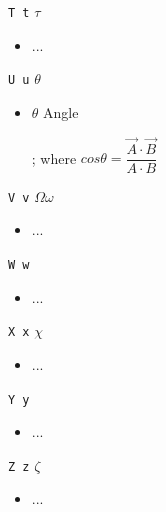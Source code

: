 \texttt{T t} $\tau$\begin{itemize}

\item ...

\end{itemize}

\texttt{U u} $\theta$\begin{itemize}

\item $\theta$ Angle

; where $cos \theta = \dfrac{\vec{A} \cdot \vec{B}}{A \cdot B}$

\end{itemize}

\texttt{V v} $\Omega \omega$\begin{itemize}

\item ...

\end{itemize}

\texttt{W w} \begin{itemize}

\item ...

\end{itemize}

\texttt{X x} $\chi$\begin{itemize}

\item ...

\end{itemize}

\texttt{Y y} \begin{itemize}

\item ...

\end{itemize}

\texttt{Z z} $\zeta$\begin{itemize}

\item ...

\end{itemize}

\newpage

